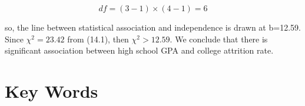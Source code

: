 \documentclass[11pt]{book}\usepackage[]{graphicx}\usepackage[]{color}
\begin{document}
\begin{equation*}
df = (3 - 1) \times (4 - 1) = 6
\end{equation*}

so, the line between statistical association and independence is drawn at b=12.59.  
Since $\chi^2 = 23.42$ from (14.1), then $\chi^2 > 12.59$.   We conclude that there is significant association between high school GPA and college attrition rate.

\section{Key Words}


\twocolumn

\section{}
 
\end{document}
